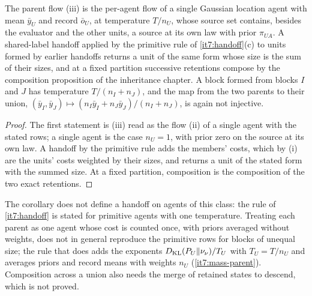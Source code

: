 \documentclass[11pt,letterpaper]{report}
\begin{document}
The parent flow (iii) is the per-agent flow of a single Gaussian location agent with mean $\bar y_U$ and record $\bar o_U$, at temperature $T/n_U$, whose source set contains, besides the evaluator and the other units, a source at its own law with prior $\pi_{UA}$. A shared-label handoff applied by the primitive rule of \cref{it7:handoff}(c) to units formed by earlier handoffs returns a unit of the same form whose size is the sum of their sizes, and at a fixed partition successive retentions compose by the composition proposition of the inheritance chapter. A block formed from blocks $I$ and $J$ has temperature $T/(n_I+n_J)$, and the map from the two parents to their union, $(\bar y_I,\bar y_J)\mapsto(n_I\bar y_I+n_J\bar y_J)/(n_I+n_J)$, is again not injective.
\begin{proof}
The first statement is (iii) read as the flow (ii) of a single agent with the stated rows; a single agent is the case $n_U=1$, with prior zero on the source at its own law. A handoff by the primitive rule adds the members' costs, which by (i) are the units' costs weighted by their sizes, and returns a unit of the stated form with the summed size. At a fixed partition, composition is the composition of the two exact retentions.
\end{proof}

The corollary does not define a handoff on agents of this class: the rule of \cref{it7:handoff} is stated for primitive agents with one temperature. Treating each parent as one agent whose cost is counted once, with priors averaged without weights, does not in general reproduce the primitive rows for blocks of unequal size; the rule that does adds the exponents $D_{\mathrm{KL}}(P_U\Vert\nu_\nu)/T_U$ with $T_U=T/n_U$ and averages priors and record means with weights $n_U$ (\cref{it7:mass-parent}). Composition across a union also needs the merge of retained states to descend, which is not proved.
\end{document}
